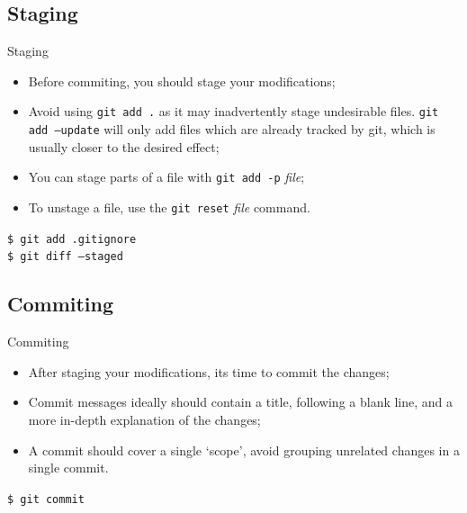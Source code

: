 \documentclass{beamer}
\begin{document}
\subsection{Staging}
\begin{frame}{Staging}
  \begin{itemize}
    \item Before commiting, you should stage your modifications;
    \item Avoid using \texttt{git add .} as it may inadvertently stage undesirable files. \texttt{git add --update} will only add files which are already tracked by git, which is usually closer to the desired effect;
    \item You can stage parts of a file with \texttt{git add -p} \textit{file};
    \item To unstage a file, use the \texttt{git reset} \textit{file} command.
  \end{itemize}
  \begin{block}{}
    \texttt{\$ git add .gitignore} \\
    \texttt{\$ git diff --staged}
  \end{block}
\end{frame}

\subsection{Commiting}
\begin{frame}{Commiting}
  \begin{itemize}
    \item After staging your modifications, its time to commit the changes;
    \item Commit messages ideally should contain a title, following a blank line, and a more in-depth explanation of the changes;
    \item A commit should cover a single `scope', avoid grouping unrelated changes in a single commit.
  \end{itemize}
  \begin{block}{}
    \texttt{\$ git commit}
  \end{block}
  \begin{scriptsize}
    
  \end{scriptsize}
\end{frame}
\end{document}
